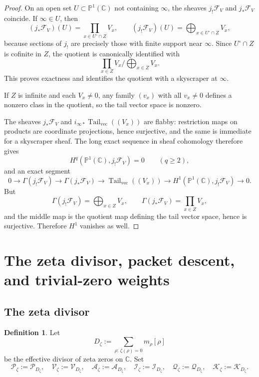 \documentclass[11pt,a4paper]{article}
\numberwithin{equation}{section}
\theoremstyle{definition}
\newtheorem{definition}[theorem]{Definition}
\theoremstyle{remark}
\DeclareMathOperator{\Tail}{Tail}
\newcommand{\CC}{\mathbb C}
\newcommand{\PP}{\mathbb P}
\newcommand{\cP}{\mathcal P}
\newcommand{\cV}{\mathcal V}
\newcommand{\cA}{\mathcal A}
\newcommand{\cQ}{\mathcal Q}
\newcommand{\cK}{\mathcal K}
\newcommand{\cI}{\mathcal I}
\begin{document}
\begin{proof}
On an open set $U\subset\PP^1(\CC)$ not containing $\infty$, the sheaves $j_!\mathcal F_V$ and $j_*\mathcal F_V$ coincide.  If $\infty\in U$, then
\[
(j_*\mathcal F_V)(U)=\prod_{x\in U^\circ\cap Z}V_x,
\qquad
(j_!\mathcal F_V)(U)=\bigoplus_{x\in U^\circ\cap Z}V_x,
\]
because sections of $j_!$ are precisely those with finite support near $\infty$.  Since $U^\circ\cap Z$ is cofinite in $Z$, the quotient is canonically identified with
\[
\prod_{x\in Z}V_x\Big/\bigoplus_{x\in Z}V_x.
\]
This proves exactness and identifies the quotient with a skyscraper at $\infty$.

If $Z$ is infinite and each $V_x\neq0$, any family $(v_x)$ with all $v_x\neq0$ defines a nonzero class in the quotient, so the tail vector space is nonzero.

The sheaves $j_*\mathcal F_V$ and $i_{\infty*}\Tail_{\mathrm{vec}}((V_x))$ are flabby: restriction maps on products are coordinate projections, hence surjective, and the same is immediate for a skyscraper sheaf.  The long exact sequence in sheaf cohomology therefore gives
\[
H^q(\PP^1(\CC),j_!\mathcal F_V)=0\qquad(q\ge2),
\]
and an exact segment
\[
0\to \Gamma(j_!\mathcal F_V)\to \Gamma(j_*\mathcal F_V)\to \Tail_{\mathrm{vec}}((V_x))\to H^1(\PP^1(\CC),j_!\mathcal F_V)\to0.
\]
But
\[
\Gamma(j_!\mathcal F_V)=\bigoplus_{x\in Z}V_x,
\qquad
\Gamma(j_*\mathcal F_V)=\prod_{x\in Z}V_x,
\]
and the middle map is the quotient map defining the tail vector space, hence is surjective.  Therefore $H^1$ vanishes as well.
\end{proof}

\section{The zeta divisor, packet descent, and trivial-zero weights}

\subsection{The zeta divisor}

\begin{definition}
Let
\[
D_\zeta:=\sum_{\rho:\,\zeta(\rho)=0}m_\rho[\rho]
\]
be the effective divisor of zeta zeros on $\CC$.  Set
\[
\cP_\zeta:=\cP_{D_\zeta},\quad
\cV_\zeta:=\cV_{D_\zeta},\quad
\cA_\zeta:=\cA_{D_\zeta},\quad
\cI_\zeta:=\cI_{D_\zeta},\quad
\cQ_\zeta:=\cQ_{D_\zeta},\quad
\cK_\zeta:=\cK_{D_\zeta}.
\]
\end{definition}
\end{document}

